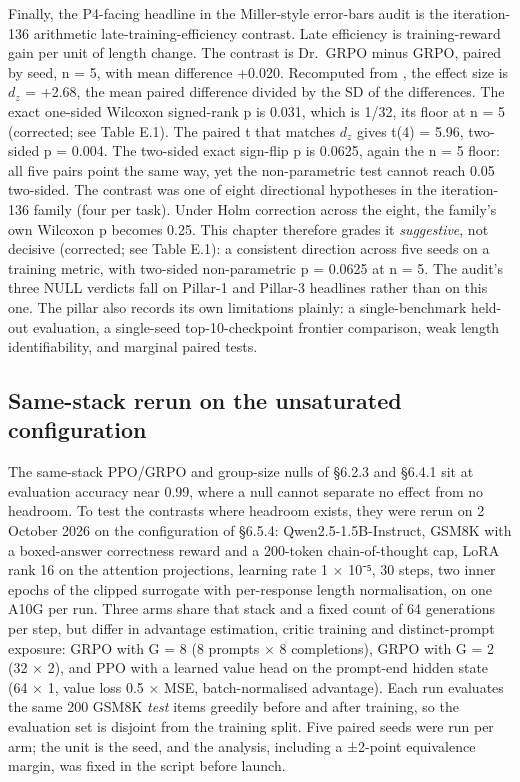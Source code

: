 \documentclass[12pt,a4paper]{report}
\DeclareRobustCommand{\longtok}[1]{\texttt{\seqsplit{#1}}}
\begin{document}
Finally, the P4-facing headline in the Miller-style error-bars audit is
the iteration-136 arithmetic late-training-efficiency contrast. Late
efficiency is training-reward gain per unit of length change. The
contrast is Dr.~GRPO minus GRPO, paired by seed, n = 5, with mean
difference +0.020. Recomputed from
\longtok{length\_\allowbreak{}bias\_\allowbreak{}iter136\_\allowbreak{}step\_\allowbreak{}coupling.tsv}, the effect size is
\(d_z\) = +2.68, the mean paired difference divided by the SD of the
differences. The exact one-sided Wilcoxon signed-rank p is 0.031, which
is 1/32, its floor at n = 5 (corrected; see Table E.1). The paired t
that matches \(d_z\) gives t(4) = 5.96, two-sided p = 0.004. The
two-sided exact sign-flip p is 0.0625, again the n = 5 floor: all five
pairs point the same way, yet the non-parametric test cannot reach 0.05
two-sided. The contrast was one of eight directional hypotheses in the
iteration-136 family (four per task). Under Holm correction across the
eight, the family's own Wilcoxon p becomes 0.25. This chapter therefore
grades it \emph{suggestive}, not decisive (corrected; see Table E.1): a
consistent direction across five seeds on a training metric, with
two-sided non-parametric p = 0.0625 at n = 5. The audit's three NULL
verdicts fall on Pillar-1 and Pillar-3 headlines rather than on this
one. The pillar also records its own limitations plainly: a
single-benchmark held-out evaluation, a single-seed top-10-checkpoint
frontier comparison, weak length identifiability, and marginal paired
tests.

\subsection{Same-stack rerun on the unsaturated
configuration}\label{same-stack-rerun-on-the-unsaturated-configuration}

The same-stack PPO/GRPO and group-size nulls of §6.2.3 and §6.4.1 sit at
evaluation accuracy near 0.99, where a null cannot separate no effect
from no headroom. To test the contrasts where headroom exists, they were
rerun on 2 October 2026 on the configuration of §6.5.4:
Qwen2.5-1.5B-Instruct, GSM8K with a boxed-answer correctness reward and
a 200-token chain-of-thought cap, LoRA rank 16 on the attention
projections, learning rate 1 × 10⁻⁵, 30 steps, two inner epochs of the
clipped surrogate with per-response length normalisation, on one A10G
per run. Three arms share that stack and a fixed count of 64 generations
per step, but differ in advantage estimation, critic training and
distinct-prompt exposure: GRPO with G = 8 (8 prompts × 8 completions),
GRPO with G = 2 (32 × 2), and PPO with a learned value head on the
prompt-end hidden state (64 × 1, value loss 0.5 × MSE, batch-normalised
advantage). Each run evaluates the same 200 GSM8K \emph{test} items
greedily before and after training, so the evaluation set is disjoint
from the training split. Five paired seeds were run per arm; the unit is
the seed, and the analysis, including a ±2-point equivalence margin, was
fixed in the script before launch.
\end{document}
